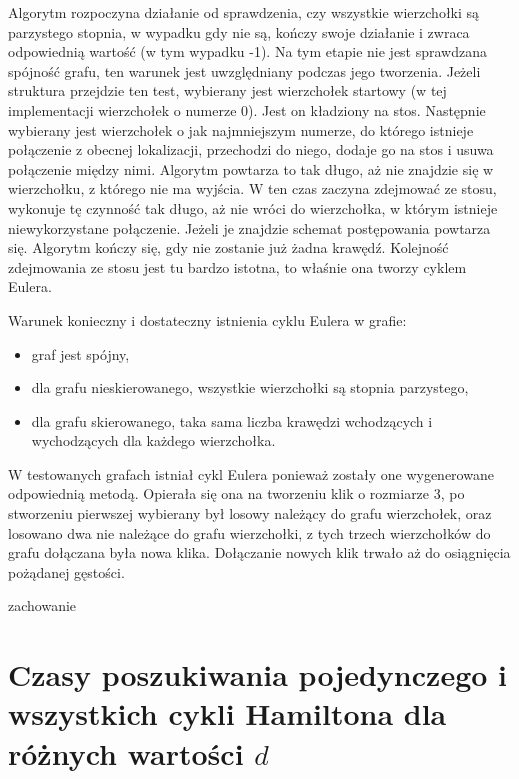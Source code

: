 \documentclass[polish,polish,a4paper]{article}
\begin{document}
\begin{spacing}{1.25}
Algorytm rozpoczyna działanie od sprawdzenia, czy wszystkie wierzchołki są parzystego stopnia, w wypadku gdy nie są, kończy swoje działanie i zwraca odpowiednią wartość (w tym wypadku -1). Na tym etapie nie jest sprawdzana spójność grafu, ten warunek jest uwzględniany podczas jego tworzenia. Jeżeli struktura przejdzie ten test, wybierany jest wierzchołek startowy (w tej implementacji wierzchołek o numerze 0). Jest on kładziony na stos. Następnie wybierany jest wierzchołek o jak najmniejszym numerze, do którego istnieje połączenie z obecnej lokalizacji, przechodzi do niego, dodaje go na stos i usuwa połączenie między nimi. Algorytm powtarza to tak długo, aż nie znajdzie się w wierzchołku, z którego nie ma wyjścia. W ten czas zaczyna zdejmować ze stosu, wykonuje tę czynność tak długo, aż nie wróci do wierzchołka, w którym istnieje niewykorzystane połączenie. Jeżeli je znajdzie schemat postępowania powtarza się. Algorytm kończy się, gdy nie zostanie już żadna krawędź. Kolejność zdejmowania ze stosu jest tu bardzo istotna, to właśnie ona tworzy cyklem Eulera.

Warunek konieczny i dostateczny istnienia cyklu Eulera w grafie:
\begin{spacing}{0.5}
	\begin{itemize}
		\item graf jest spójny,
		\item dla grafu nieskierowanego, wszystkie wierzchołki są stopnia parzystego,
		\item dla grafu skierowanego, taka sama liczba krawędzi wchodzących i wychodzących dla każdego wierzchołka.
	\end{itemize}
\end{spacing}

W testowanych grafach istniał cykl Eulera ponieważ zostały one wygenerowane odpowiednią metodą.
Opierała się ona na tworzeniu klik o rozmiarze 3, po stworzeniu pierwszej wybierany był losowy należący do grafu wierzchołek, oraz losowano dwa nie należące do grafu wierzchołki, z tych trzech wierzchołków do grafu dołączana była nowa klika. Dołączanie nowych klik trwało aż do osiągnięcia pożądanej gęstości.

{\huge zachowanie}




\section{Czasy poszukiwania pojedynczego i wszystkich cykli Hamiltona dla różnych wartości $d$}



\end{spacing}
\end{document}

